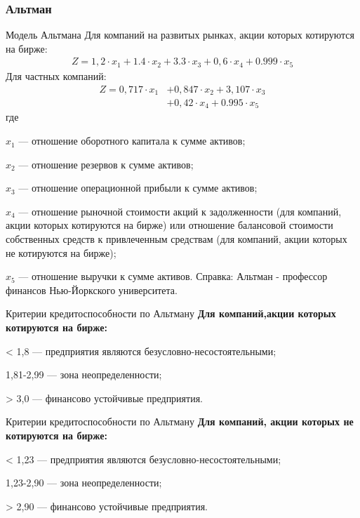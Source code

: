 \documentclass[_Banking_p2.tex]{subfiles}
\begin{document}
\subsubsection{Альтман}
\begin{frame}[shrink=25]{Модель Альтмана}{}
Для компаний на развитых рынках, акции которых котируются на бирже:
\begin{align}
Z=1,2 \cdot x_1+1.4\cdot x_2+3.3\cdot x_3+0,6\cdot x_4+0.999\cdot x_5	
\end{align}
Для частных компаний:		
\begin{align}
Z=0,717\cdot x_1 &+0,847\cdot x_2+3,107\cdot x_3\nonumber \\ &+0,42\cdot x_4+0.995\cdot x_5
\end{align}
где				

$x_1$ — отношение оборотного капитала к сумме активов;

$x_2$ — отношение резервов к сумме активов;

$x_3$ — отношение операционной прибыли к сумме активов;

$x_4$ — отношение рыночной стоимости акций к задолженности (для компаний, акции которых котируются на бирже) или отношение балансовой стоимости собственных средств к привлеченным средствам (для компаний, акции которых не котируются на бирже);

$x_5$ — отношение выручки к сумме активов.
Справка: Альтман - профессор финансов Нью-Йоркского университета.
\end{frame}

\begin{frame}{Критерии кредитоспособности по Альтману}
\textbf{Для компаний,\linebreak акции которых котируются на бирже:
}

< 1,8 — предприятия являются безусловно-несостоятельными;

1,81-2,99 — зона неопределенности;

> 3,0 — финансово устойчивые предприятия.
\end{frame}

\begin{frame}{Критерии кредитоспособности по Альтману}
\textbf{Для компаний, \linebreak акции которых не котируются на бирже:
}

< 1,23 — предприятия являются безусловно-несостоятельными;

1,23-2,90 — зона неопределенности;

> 2,90 — финансово устойчивые предприятия.

\bigskip
\end{frame}
\end{document}
